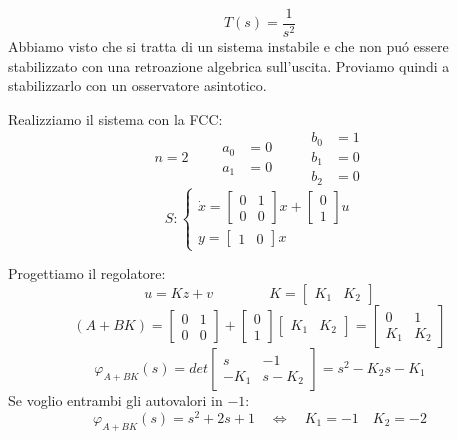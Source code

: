 \documentclass[../main.tex]{subfiles}
\begin{document}
		\begin{mdframed}[style=Exercise]
			\begin{Exercise}[title={Stabilizzazione di un sistema con osservatore}, difficulty=1]
				\[
					T(s) = \dfrac{1}{s^2}
				\]
				Abbiamo visto che si tratta di un sistema instabile e che non pu\'o essere stabilizzato con una retroazione algebrica sull'uscita. Proviamo quindi a stabilizzarlo con un osservatore asintotico.
				
				Realizziamo il sistema con la FCC:
				\[
					n = 2
					\qquad
					\begin{aligned}
						a_0 &= 0\\
						a_1 &= 0
					\end{aligned}
					\qquad
					\begin{aligned}
						b_0 &= 1\\
						b_1 &= 0\\
						b_2 &= 0
					\end{aligned}
				\]
				\[
					S:
					\begin{cases}
						\dot x =
						\begin{bmatrix}
							0 & 1\\
							0 & 0
						\end{bmatrix} x+
						\begin{bmatrix}
							0\\
							1
						\end{bmatrix} u
						\\[1em]
						y =
						\begin{bmatrix}
							1 & 0
						\end{bmatrix} x
					\end{cases}
				\]
				
				Progettiamo il regolatore:
				\[
					u = Kz + v \qquad\qquad K =
					\begin{bmatrix}
						K_1 & K_2
					\end{bmatrix}
				\]
				\[
					(A+BK) =
					\begin{bmatrix}
						0 & 1\\
						0 & 0
					\end{bmatrix} +
					\begin{bmatrix}
						0\\
						1
					\end{bmatrix}
					\begin{bmatrix}
						K_1 & K_2
					\end{bmatrix} =
					\begin{bmatrix}
						0 & 1\\
						K_1 & K_2
					\end{bmatrix}
				\]
				\[
					\varphi_{A+BK}(s) = det
					\begin{bmatrix}
						s & -1\\
						-K_1 & s-K_2
					\end{bmatrix} = s^2 - K_2s - K_1
				\]
				Se voglio entrambi gli autovalori in $ -1 $:
				\[
					\varphi_{A+BK}(s) = s^2 + 2s + 1 \quad\Leftrightarrow\quad K_1 = -1 \quad K_2 = -2
				\]
				

\end{Exercise}
\end{mdframed}
\end{document}
